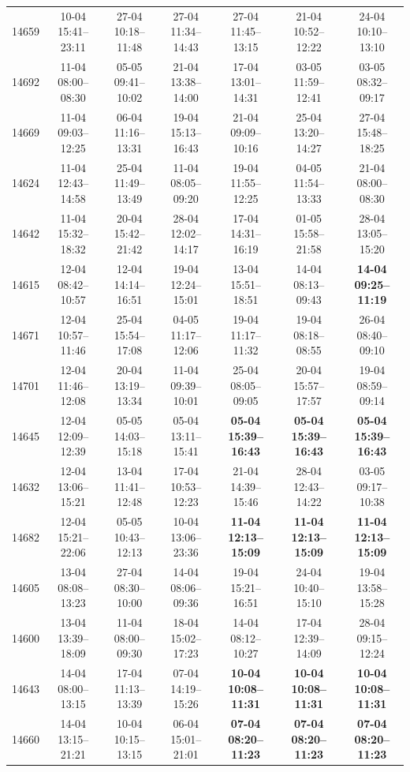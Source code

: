 \begin{table}[htbp]
\begin{tabular}{|r|c|c|c|c|c|c|}
14659 & 10-04 15:41--23:11 & 27-04 10:18--11:48 & 27-04 11:34--14:43 & 27-04 11:45--13:15 & 21-04 10:52--12:22 & 24-04 10:10--13:10 \\ 
14692 & 11-04 08:00--08:30 & 05-05 09:41--10:02 & 21-04 13:38--14:00 & 17-04 13:01--14:31 & 03-05 11:59--12:41 & 03-05 08:32--09:17 \\ 
14669 & 11-04 09:03--12:25 & 06-04 11:16--13:31 & 19-04 15:13--16:43 & 21-04 09:09--10:16 & 25-04 13:20--14:27 & 27-04 15:48--18:25 \\ 
14624 & 11-04 12:43--14:58 & 25-04 11:49--13:49 & 11-04 08:05--09:20 & 19-04 11:55--12:25 & 04-05 11:54--13:33 & 21-04 08:00--08:30 \\ 
14642 & 11-04 15:32--18:32 & 20-04 15:42--21:42 & 28-04 12:02--14:17 & 17-04 14:31--16:19 & 01-05 15:58--21:58 & 28-04 13:05--15:20 \\ 
14615 & 12-04 08:42--10:57 & 12-04 14:14--16:51 & 19-04 12:24--15:01 & 13-04 15:51--18:51 & 14-04 08:13--09:43 & \textbf{14-04 09:25--11:19} \\ 
14671 & 12-04 10:57--11:46 & 25-04 15:54--17:08 & 04-05 11:17--12:06 & 19-04 11:17--11:32 & 19-04 08:18--08:55 & 26-04 08:40--09:10 \\ 
14701 & 12-04 11:46--12:08 & 20-04 13:19--13:34 & 11-04 09:39--10:01 & 25-04 08:05--09:05 & 20-04 15:57--17:57 & 19-04 08:59--09:14 \\ 
14645 & 12-04 12:09--12:39 & 05-05 14:03--15:18 & 05-04 13:11--15:41 & \textbf{05-04 15:39--16:43} & \textbf{05-04 15:39--16:43} & \textbf{05-04 15:39--16:43} \\ 
14632 & 12-04 13:06--15:21 & 13-04 11:41--12:48 & 17-04 10:53--12:23 & 21-04 14:39--15:46 & 28-04 12:43--14:22 & 03-05 09:17--10:38 \\ 
14682 & 12-04 15:21--22:06 & 05-05 10:43--12:13 & 10-04 13:06--23:36 & \textbf{11-04 12:13--15:09} & \textbf{11-04 12:13--15:09} & \textbf{11-04 12:13--15:09} \\ 
14605 & 13-04 08:08--13:23 & 27-04 08:30--10:00 & 14-04 08:06--09:36 & 19-04 15:21--16:51 & 24-04 10:40--15:10 & 19-04 13:58--15:28 \\ 
14600 & 13-04 13:39--18:09 & 11-04 08:00--09:30 & 18-04 15:02--17:23 & 14-04 08:12--10:27 & 17-04 12:39--14:09 & 28-04 09:15--12:24 \\ 
14643 & 14-04 08:00--13:15 & 17-04 11:13--13:39 & 07-04 14:19--15:26 & \textbf{10-04 10:08--11:31} & \textbf{10-04 10:08--11:31} & \textbf{10-04 10:08--11:31} \\ 
14660 & 14-04 13:15--21:21 & 10-04 10:15--13:15 & 06-04 15:01--21:01 & \textbf{07-04 08:20--11:23} & \textbf{07-04 08:20--11:23} & \textbf{07-04 08:20--11:23} \\ 

\end{tabular}
\end{table}
